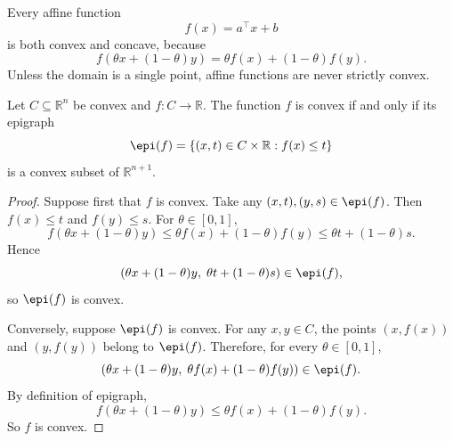 \begin{eg}
	Every affine function
	\[
		f(x) = a^\top x + b
	\]
	is both convex and concave, because
	\[
		f(\theta x + (1-\theta)y)
		= \theta f(x) + (1-\theta)f(y).
	\]
	Unless the domain is a single point, affine functions are never strictly convex.
\end{eg}

\begin{theorem}\label{thm:l1-epigraph-characterization}
	Let $C \subseteq \mathbb{R}^n$ be convex and $f:C \to \mathbb{R}$. The function $f$ is convex if and only if its epigraph
	\[
		\epi(f) = \{(x,t) \in C \times \mathbb{R} : f(x) \le t\}
	\]
	is a convex subset of $\mathbb{R}^{n+1}$.
\end{theorem}
\begin{proof}
	Suppose first that $f$ is convex. Take any $(x,t),(y,s) \in \epi(f)$. Then $f(x) \le t$ and $f(y) \le s$. For $\theta \in [0,1]$,
	\[
		f(\theta x + (1-\theta)y)
		\le \theta f(x) + (1-\theta)f(y)
		\le \theta t + (1-\theta)s.
	\]
	Hence
	\[
		(\theta x + (1-\theta)y,\; \theta t + (1-\theta)s) \in \epi(f),
	\]
	so $\epi(f)$ is convex.

	Conversely, suppose $\epi(f)$ is convex. For any $x,y \in C$, the points $(x,f(x))$ and $(y,f(y))$ belong to $\epi(f)$. Therefore, for every $\theta \in [0,1]$,
	\[
		(\theta x + (1-\theta)y,\; \theta f(x) + (1-\theta)f(y)) \in \epi(f).
	\]
	By definition of epigraph,
	\[
		f(\theta x + (1-\theta)y)
		\le \theta f(x) + (1-\theta)f(y).
	\]
	So $f$ is convex.
\end{proof}

